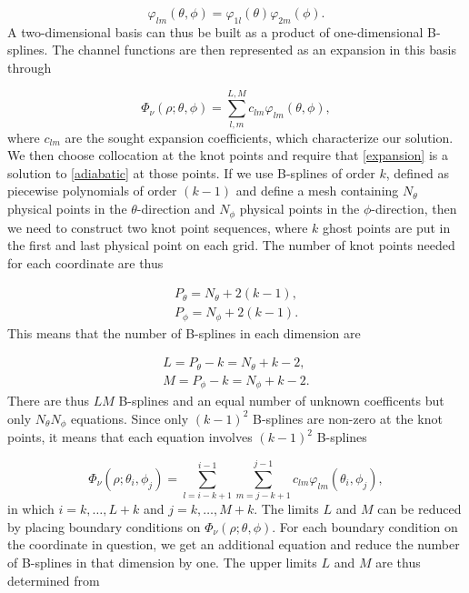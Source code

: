 \begin{equation}
\varphi_{lm} (\theta,\phi) = \varphi_{1l}(\theta)\varphi_{2m}(\phi).
\end{equation}
A two-dimensional basis can thus be built as a product of one-dimensional B-splines. The channel functions are then represented as an expansion in this basis through  

\begin{equation}\label{expansion}
\Phi_{\nu}(\rho;\theta,\phi) = \sum_{l,m}^{L,M} c_{lm}\varphi_{lm} (\theta,\phi),
\end{equation}
where $c_{lm}$ are the sought expansion coefficients, which characterize our solution. We then choose collocation at the knot points and require that \eqref{expansion} is a solution to \eqref{adiabatic} at those points.  If we use B-splines of order $k$, defined as piecewise polynomials of order $(k-1)$ and define a mesh containing $N_{\theta}$ physical points in the $\theta$-direction and $N_{\phi}$ physical points in the $\phi$-direction, then we need to construct two knot point sequences, where $k$ ghost points are put in the first and last physical point on each grid. The number of knot points needed for each coordinate are thus

\begin{equation}
\begin{aligned}
P_{\theta}=N_{\theta}+2(k-1),\\
P_{\phi}=N_{\phi}+2(k-1).
\end{aligned}
\end{equation}
This means that the number of B-splines in each dimension are

\begin{equation}
\begin{aligned}
L = P_{\theta}-k=N_{\theta}+k-2,\\
M = P_{\phi}-k = N_{\phi}+k-2.
\end{aligned}
\end{equation}
There are thus $LM$ B-splines and an equal number of unknown coefficents but only $N_{\theta}N_{\phi}$ equations. Since only $(k-1)^2$ B-splines are non-zero at the knot points, it means that each equation involves $(k-1)^2$ B-splines

\begin{equation}
\Phi_{\nu}(\rho;\theta_i,\phi_j) = \sum_{l=i-k+1}^{i-1}\sum_{m=j-k+1}^{j-1} c_{lm}\varphi_{lm} (\theta_{i},\phi_{j}),
\end{equation}
in which $i = k,\ldots,L+k$ and $j = k,\ldots,M+k$.
The limits $L$ and $M$ can be reduced by placing boundary conditions on $\Phi_{\nu}(\rho;\theta,\phi)$. For each boundary condition on the coordinate in question, we get an additional equation and reduce the number of B-splines in that dimension by one. The upper limits $L$ and $M$ are thus determined from 

